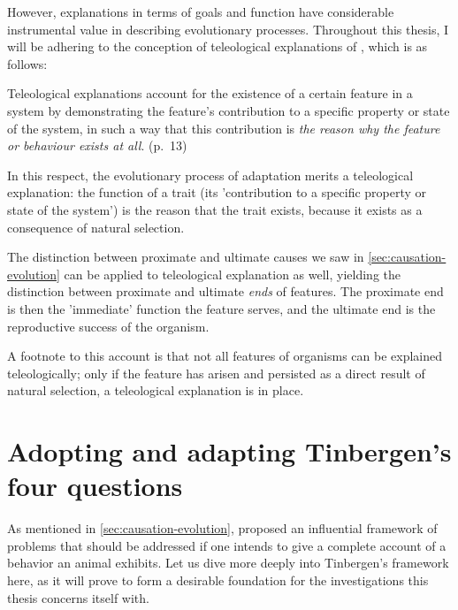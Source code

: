However, explanations in terms of goals and function have considerable instrumental value in describing evolutionary processes. Throughout this thesis, I will be adhering to the conception of teleological explanations of \citet{Ayala99}, which is as follows:
\begin{quoting}
    Teleological explanations account for the existence of a certain feature in a system by demonstrating the feature’s contribution to a specific property or state of the system, in such a way that this contribution is \emph{the reason why the feature or behaviour exists at all}.
    \hfill (p.~13)
\end{quoting}
In this respect, the evolutionary process of adaptation merits a teleological explanation: the function of a trait (its 'contribution to a specific property or state of the system') is the reason that the trait exists, because it exists as a consequence of natural selection.

The distinction between proximate and ultimate causes we saw in \cref{sec:causation-evolution} can be applied to teleological explanation as well, yielding the distinction between proximate and ultimate \emph{ends} of features. The proximate end is then the 'immediate' function the feature serves, and the ultimate end is the reproductive success of the organism.

A footnote to this account is that not all features of organisms can be explained teleologically; only if the feature has arisen and persisted as a direct result of natural selection, a teleological explanation is in place.

\section{Adopting and adapting Tinbergen's four questions}
\label{sec:tinbergen}
As mentioned in \cref{sec:causation-evolution}, \citet{Tinbergen63} proposed an influential framework of problems that should be addressed if one intends to give a complete account of a behavior an animal exhibits. Let us dive more deeply into Tinbergen's framework here, as it will prove to form a desirable foundation for the investigations this thesis concerns itself with.

